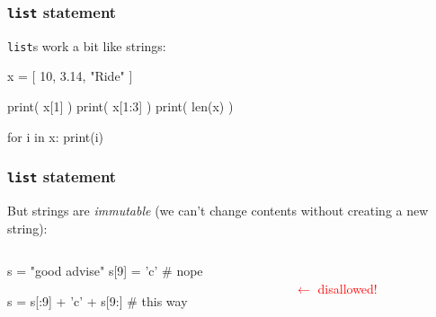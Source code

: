 \documentclass[11pt]{beamer}
\begin{document}
\begin{frame}[fragile]
  \frametitle{\texttt{list} statement}
  \Enlarge

  \begin{itemize}
  \myitem  \texttt{list}s work a bit like strings:
    \begin{semiverbatim}
x = [ 10, 3.14, "Ride" ]

print( x[1] )
print( x[1:3] )
print( len(x) )

for i in x:
    print(i)
    \end{semiverbatim}
  \end{itemize}
\end{frame}

\begin{frame}[fragile]
  \frametitle{\texttt{list} statement}
  \Enlarge

  \begin{itemize}
  \myitem  But strings are \emph{immutable} (we can't change contents without creating a new string): \pause
  \end{itemize}
  \begin{columns}
  \begin{column}{0.6\textwidth}
    \begin{semiverbatim}
s = "good advise"
s[9] = 'c'                 # nope

s = s[:9] + 'c' + s[9:]    # this way
    \end{semiverbatim}
  \end{column}
  \begin{column}{0.4\textwidth}
  ~ \\
  \textcolor{red}{$\leftarrow$ disallowed!}
  ~ \\
  \end{column}
  \end{columns}
\end{frame}
\end{document}
